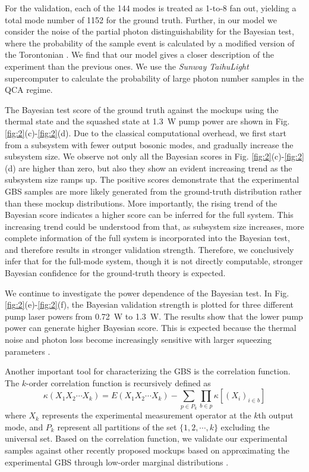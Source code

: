 \documentclass[aps,prl,groupedaddress,superscriptaddress,showpacs,reprint,nofootinbib,nolongbibliography]{revtex4-2}
\begin{document}
For the validation, each of the 144 modes is treated as 1-to-8 fan out, yielding a total mode number of 1152 for the ground truth. Further, in our model we consider the noise of the partial photon distinguishability for the Bayesian test, where the probability of the sample event is calculated by a modified version of the Torontonian \cite{suppl}. We find that our model gives a closer description of the experiment than the previous ones. We use the \textit{Sunway TaihuLight} supercomputer to calculate the probability of large photon number samples in the QCA regime.


The Bayesian test score of the ground truth against the mockups using the thermal state and the squashed state at \SI{1.3}{W} pump power are shown in Fig. \ref{fig:2}(c)-\ref{fig:2}(d). Due to the classical computational overhead, we first start from a subsystem with fewer output bosonic modes, and gradually increase the subsystem size. We observe not only all the Bayesian scores in Fig. \ref{fig:2}(c)-\ref{fig:2}(d) are higher than zero, but also they show an evident increasing trend as the subsystem size ramps up.
The positive scores demonstrate that the experimental GBS samples are more likely generated from the ground-truth distribution rather than these mockup distributions. More importantly, the rising trend of the Bayesian score indicates a higher score can be inferred for the full system. This increasing trend could be understood from that, as subsystem size increases, more complete information of the full system is incorporated into the Bayesian test, and therefore results in stronger validation strength.
Therefore, we conclusively infer that for the full-mode system, though it is not directly computable, stronger Bayesian confidence for the ground-truth theory is expected.

We continue to investigate the power dependence of the Bayesian test. In Fig. \ref{fig:2}(e)-\ref{fig:2}(f), the Bayesian validation strength is plotted for three different pump laser powers from \SI{0.72}{W} to \SI{1.3}{W}. The results show that the lower pump power can generate higher Bayesian score. This is expected because the thermal noise and photon loss become increasingly sensitive with larger squeezing parameters \cite{qiRegimesClassicalSimulability2020}.

Another important tool for characterizing the GBS is the correlation function. The $k$-order correlation function is recursively defined as
\begin{equation}
    \kappa(X_{1}X_{2}\cdots X_{k})=E(X_{1}X_{2}\cdots X_{k})-\sum_{p\in P_k}\prod_{b\in p}\kappa[(X_{i})_{i\in b}]
\end{equation}
where $X_k$ represents the experimental measurement operator at the $k$th output mode, and $P_k$ represent all partitions of the set $\{1,2,\cdots,k\}$ excluding the universal set. Based on the correlation function, we validate our experimental samples against other recently proposed mockups based on approximating the experimental GBS through low-order marginal distributions \cite{villalongaEfficientApproximationExperimental2022}.
\end{document}

